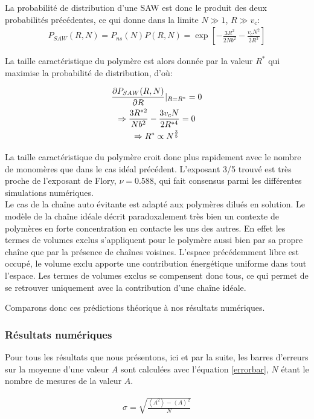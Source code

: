 \documentclass[a4paper,11pt]{article}
\begin{document}
La probabilité de distribution d'une SAW est donc le produit des deux probabilités précédentes, ce qui donne dans la limite $N \gg 1$, $R \gg v_c$:
\begin{eqnarray}
P_{SAW}(R,N)=P_{ns}(N) P(R,N)=\exp\left[-\frac{3R^2}{2 N b^2}-\frac{v_cN^2}{2R^3}\right]
\end{eqnarray}

La taille caractéristique du polymère est alors donnée par la valeur $R^*$ qui maximise la probabilité de distribution, d'où:

\begin{gather}
\frac{\partial P_{SAW}(R,N)}{\partial R} \Huge{|} _{R=R^*}=0 \nonumber\\
\Rightarrow \frac{3R^{*2}}{Nb^2}-\frac{3v_cN}{2R^{*4}} =0 \\
\Rightarrow R^* \propto N^\frac{3}{5}\nonumber
\end{gather}


La taille caractéristique du polymère croit donc plus rapidement avec le nombre de monomères que dans le cas idéal précédent. L'exposant 3/5 trouvé est très proche de l'exposant de Flory, $\nu=0.588$, qui fait consensus parmi les différentes simulations numériques. \\


Le cas de la chaîne auto évitante est adapté aux polymères dilués en solution. Le modèle de la chaîne idéale décrit paradoxalement très bien un contexte de polymères en forte concentration en contacte les uns des autres. En effet les termes de volumes exclus s'appliquent pour le polymère aussi bien par sa propre chaîne que par la présence de chaînes voisines. L'espace précédemment libre est occupé, le volume exclu apporte une contribution énergétique uniforme dans tout l'espace. Les termes de volumes exclus se compensent donc tous, ce qui permet de se retrouver uniquement avec la contribution d'une chaîne idéale.

Comparons donc ces prédictions théorique à nos résultats numériques.

\subsubsection*{Résultats numériques}
Pour tous les résultats que nous présentons, ici et par la suite, les barres d'erreurs sur la moyenne d'une valeur $A$ sont calculées avec l'équation \ref{errorbar}, $N$ étant le nombre de mesures de la valeur $A$.

\begin{eqnarray}
\sigma=\sqrt{\frac{\left<A^2\right>-\left<A\right>^2}{N}}
\label{errorbar}
\end{eqnarray}
\end{document}
